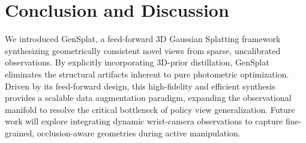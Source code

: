 \section{Conclusion and Discussion}
\label{sec:Conclusion}
\vspace{-1ex}


We introduced GenSplat, a feed-forward 3D Gaussian Splatting framework synthesizing geometrically consistent novel views from sparse, uncalibrated observations. 
By explicitly incorporating 3D-prior distillation, GenSplat eliminates the structural artifacts inherent to pure photometric optimization. 
Driven by its feed-forward design, this high-fidelity and efficient synthesis provides a scalable data augmentation paradigm, expanding the observational manifold to resolve the critical bottleneck of policy view generalization. 
Future work will explore integrating dynamic wrist-camera observations to capture fine-grained, occlusion-aware geometries during active manipulation.






\clearpage
